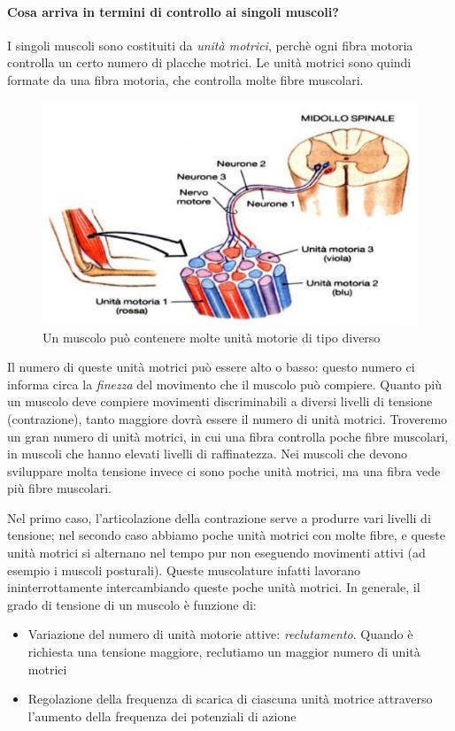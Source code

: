 \documentclass[a4paper,12pt]{article}
\begin{document}
\paragraph{Cosa arriva in termini di controllo ai singoli muscoli?}
I singoli muscoli sono costituiti da \emph{unità motrici}, perchè ogni fibra motoria controlla un certo numero di placche motrici. Le unità motrici sono quindi formate da una fibra motoria, che controlla molte fibre muscolari.
\begin{figure}[H]
\centering
\includegraphics[scale=0.4]{immagine/unita_motoria.jpg}
\caption{Un muscolo può contenere molte unità motorie di tipo diverso}
\end{figure}

Il numero di queste unità motrici può essere alto o basso: questo numero ci informa circa la \emph{finezza} del movimento che il muscolo può compiere. Quanto più un muscolo deve compiere movimenti discriminabili a diversi livelli di tensione (contrazione), tanto maggiore dovrà essere il numero di unità motrici. Troveremo un gran numero di unità motrici, in cui una fibra controlla poche fibre muscolari, in muscoli che hanno elevati livelli di raffinatezza. Nei muscoli che devono sviluppare molta tensione invece ci sono poche unità motrici, ma una fibra vede più fibre muscolari.

Nel primo caso, l'articolazione della contrazione serve a produrre vari livelli di tensione; nel secondo caso abbiamo poche unità motrici con molte fibre, e queste unità motrici si alternano nel tempo pur non eseguendo movimenti attivi (ad esempio i muscoli posturali). Queste muscolature infatti lavorano ininterrottamente intercambiando queste poche unità motrici. 
In generale, il grado di tensione di un muscolo è funzione di:
\begin{itemize}
\item{Variazione del numero di unità motorie attive: \emph{reclutamento}. Quando è richiesta una tensione maggiore, reclutiamo un maggior numero di unità motrici}
\item{Regolazione della frequenza di scarica di ciascuna unità motrice attraverso l'aumento della frequenza dei potenziali di azione}
\end{itemize}
\end{document}
